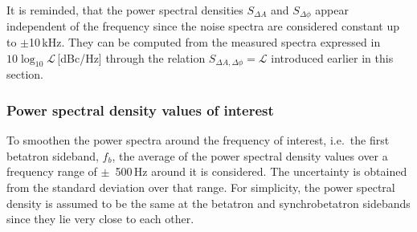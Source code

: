 It is reminded, that the power spectral densities $S_{\Delta A}$ and $S_{\Delta \phi}$ appear independent of the frequency since the noise spectra are considered constant up to $\pm$10\,kHz. They can be computed from the measured spectra expressed in $10\log_{10}\mathcal{L}$\,[dBc/Hz] through the relation $S_{\Delta A, \Delta \phi} = \mathcal{L}$ introduced earlier in this section.


\subsubsection*{Power spectral density values of interest}



To smoothen the power spectra around the frequency of interest, i.e.~the first betatron sideband, $f_b$, the average of the power spectral density values over a frequency range of $\pm$~500\,Hz around it is considered. The uncertainty is obtained from the standard deviation over that range. For simplicity, the power spectral density is assumed to be the same at the betatron and synchrobetatron sidebands since they lie very close to each other.



